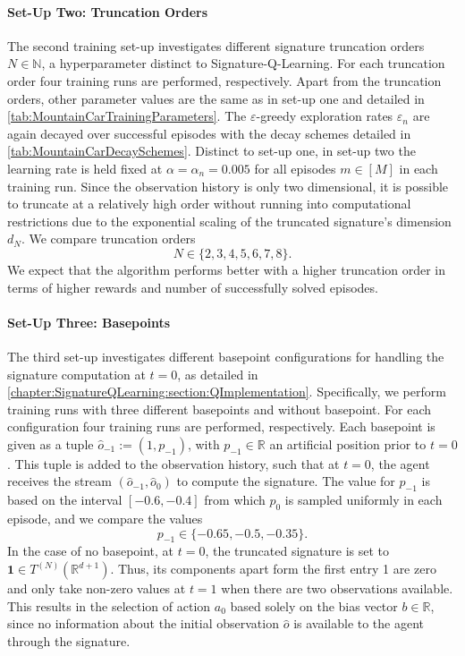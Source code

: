 \documentclass[
    a4paper,
    11pt,
    bibliography=totoc,
    listof=totoc,      
    headinclude=true,
    cleardoublepage=empty,
]{scrbook}
\theoremstyle{plain}
\theoremstyle{definition}
\theoremstyle{remark}
\newcommand{\SetR}{\mathbb R}
\newcommand{\SetN}{\mathbb N}
\begin{document}
\paragraph{Set-Up Two: Truncation Orders} 
\label{chapter:Experiments:section:MountainCar:sub:TrainingDetails:par:SetUpTwo}

The second training set-up investigates different signature truncation orders
$N\in\SetN$, a hyperparameter distinct to Signature-Q-Learning. For each
truncation order four training runs are performed, respectively. Apart from
the truncation orders, other parameter values are the same as in set-up one and
detailed in \cref{tab:MountainCarTrainingParameters}. The $\varepsilon$-greedy
exploration rates $\varepsilon_n$ are again decayed over successful episodes
with the decay schemes detailed in \cref{tab:MountainCarDecaySchemes}.
Distinct to set-up one, in set-up two the learning rate is held fixed at 
$\alpha = \alpha_n =0.005$ for all episodes $m\in[M]$ in each training run.
Since the observation history is only two dimensional, it is possible to
truncate at a relatively high order without running into computational
restrictions due to the exponential scaling of the truncated signature's
dimension $d_N$. We compare truncation orders
\[
    N\in\{2,3,4,5,6,7,8\}.
\]
We expect that the algorithm performs better with a higher truncation order in
terms of higher rewards and number of successfully solved episodes.

\paragraph{Set-Up Three: Basepoints}
\label{chapter:Experiments:section:MountainCar:sub:TrainingDetails:par:SetUpThree}

The third set-up investigates different basepoint configurations for handling
the signature computation at $t=0$, as detailed in
\cref{chapter:SignatureQLearning:section:QImplementation}. Specifically, we
perform training runs with three different basepoints and without basepoint.
For each configuration four training runs are performed, respectively. 
Each basepoint is given as a tuple $\hat{o}_{-1} := (1, p_{-1})$, with
$p_{-1}\in\SetR$ an artificial position prior to $t=0$. This tuple is
added to the observation history, such that at $t=0$, the agent receives the 
stream $(\hat{o}_{-1}, \hat{o}_0)$ to compute the signature. The value for
$p_{-1}$ is based on the interval $[-0.6, -0.4]$ from which $p_0$ is sampled
uniformly in each episode, and we compare the values
\[
    p_{-1} \in \{-0.65, -0.5, -0.35\}.
\]
In the case of no basepoint, at $t=0$, the truncated signature is set to 
$\bm 1\in T^{(N)}(\SetR^{d+1})$. Thus, its components apart form the first
entry 1 are zero and only take non-zero values at $t=1$ when there are two
observations available. This results in the selection of action $a_0$ based
solely on the bias vector $b\in\SetR$, since no information about the initial
observation $\hat{o}$ is available to the agent through the signature. 
\end{document}
